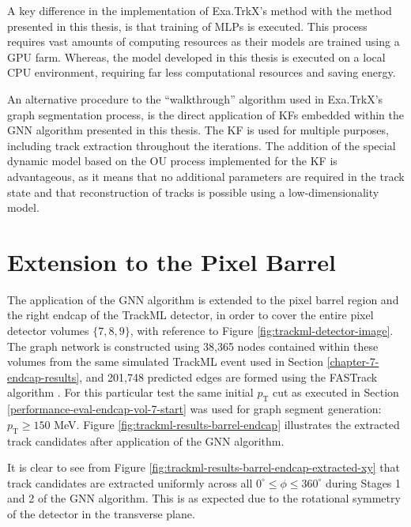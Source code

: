 A key difference in the implementation of Exa.TrkX’s method with the method presented in this thesis, is that training of MLPs is executed. This process requires vast amounts of computing resources as their models are trained using a GPU farm. Whereas, the model developed in this thesis is executed on a local CPU environment, requiring far less computational resources and saving energy.

An alternative procedure to the “walkthrough” algorithm used in Exa.TrkX’s graph segmentation process, is the direct application of KFs embedded within the GNN algorithm presented in this thesis. The KF is used for multiple purposes, including track extraction throughout the iterations. The addition of the special dynamic model based on the OU process implemented for the KF is advantageous, as it means that no additional parameters are required in the track state and that reconstruction of tracks is possible using a low-dimensionality model.










\section{Extension to the Pixel Barrel}
\label{chapter-7-outlook}


The application of the GNN algorithm is extended to the pixel barrel region and the right endcap of the TrackML detector, in order to cover the entire pixel detector volumes $\{7, 8, 9\}$, with reference to Figure \ref{fig:trackml-detector-image}. The graph network is constructed using 38,365 nodes contained within these volumes from the same simulated TrackML event used in Section \ref{chapter-7-endcap-results}, and 201,748 predicted edges are formed using the FASTrack algorithm \cite{Dmitry-fasttrack-addtest}. For this particular test the same initial $p_{\text{T}}$ cut as executed in Section \ref{performance-eval-endcap-vol-7-start} was used for graph segment generation: $p_{\text{T}} \ge 150$ MeV. Figure \ref{fig:trackml-results-barrel-endcap} illustrates the extracted track candidates after application of the GNN algorithm. 

It is clear to see from Figure \ref{fig:trackml-results-barrel-endcap-extracted-xy} that track candidates are extracted uniformly across all $ 0^{\circ} \leq \phi \leq 360^{\circ}$ during Stages 1 and 2 of the GNN algorithm. This is as expected due to the rotational symmetry of the detector in the transverse plane. 

